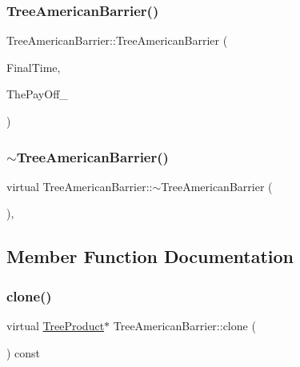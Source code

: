 \subsubsection{\texorpdfstring{Tree\+American\+Barrier()}{TreeAmericanBarrier()}}
{\footnotesize\ttfamily Tree\+American\+Barrier\+::\+Tree\+American\+Barrier (\begin{DoxyParamCaption}\item[{double}]{Final\+Time,  }\item[{const \hyperlink{classPayOffBridge}{Pay\+Off\+Bridge} \&}]{The\+Pay\+Off\+\_\+ }\end{DoxyParamCaption})}

\hypertarget{classTreeAmericanBarrier_afe01588c2d43d611877baf510a2ed651}{}\label{classTreeAmericanBarrier_afe01588c2d43d611877baf510a2ed651} 
\subsubsection{\texorpdfstring{$\sim$\+Tree\+American\+Barrier()}{~TreeAmericanBarrier()}}
{\footnotesize\ttfamily virtual Tree\+American\+Barrier\+::$\sim$\+Tree\+American\+Barrier (\begin{DoxyParamCaption}{ }\end{DoxyParamCaption})\hspace{0.3cm}{\ttfamily [inline]}, {\ttfamily [virtual]}}



\subsection{Member Function Documentation}
\hypertarget{classTreeAmericanBarrier_a25a7d1fdcfd55228de1b4f50d0b3943d}{}\label{classTreeAmericanBarrier_a25a7d1fdcfd55228de1b4f50d0b3943d} 
\subsubsection{\texorpdfstring{clone()}{clone()}}
{\footnotesize\ttfamily virtual \hyperlink{classTreeProduct}{Tree\+Product}$\ast$ Tree\+American\+Barrier\+::clone (\begin{DoxyParamCaption}{ }\end{DoxyParamCaption}) const\hspace{0.3cm}{\ttfamily [virtual]}}



